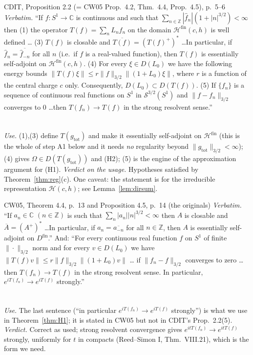 \documentclass[11pt]{article}
\newcommand{\Om}{\Omega}
\newcommand{\Hil}{\mathcal H}
\newcommand{\norm}[1]{\lVert #1\rVert}
\newcommand{\gtot}{g_{\mathrm{tot}}}
\newcommand{\Hfin}{\Hil^{\mathrm{fin}}}
\begin{document}
\begin{citedbox}{CDIT, Proposition 2.2 (= CW05 Prop.~4.2, Thm.~4.4, Prop.~4.5), p.~5--6}
\emph{Verbatim.} ``If $f:S^1\to\mathbb C$ is continuous and such that $\sum_{n\in\mathbb Z}|\hat f_n|(1+|n|^{3/2})<\infty$
then (1) the operator $T(f)=\sum_n L_n\hat f_n$ on the domain $\Hil^{\mathrm{fin}}(c,h)$ is well defined \dots
(3) $T(f)$ is closable and $\overline{T(f)}=(T(f)^+)^*$ \dots In particular, if $\hat f_n=\overline{\hat f_{-n}}$
for all $n$ (i.e.\ if $f$ is a real-valued function), then $T(f)$ is essentially self-adjoint on
$\Hil^{\mathrm{fin}}(c,h)$. (4) For every $\xi\in D(L_0)$ we have the following energy bounds
$\|T(f)\xi\|\le r\|f\|_{3/2}\|(1+L_0)\xi\|$, where $r$ is a function of the central charge $c$ only.
Consequently, $D(L_0)\subset D(T(f))$. (5) If $\{f_n\}$ is a sequence of continuous real functions on $S^1$ in
$\mathcal S^{3/2}(S^1)$ and $\|f-f_n\|_{3/2}$ converges to $0$ \dots then $T(f_n)\to T(f)$ in the strong resolvent sense.''
\\[2pt]
\\
\\[2pt]
\emph{Use.}  (1),(3) define $T(\gtot)$ and make it essentially self-adjoint on $\Hfin$ (this is the whole of step A1
below and it needs \emph{no} regularity beyond $\norm{\gtot}_{3/2}<\infty$); (4) gives $\Om\in D(T(\gtot))$ and (H2);
(5) is the engine of the approximation argument for (H1).
\emph{Verdict on the usage.}  Hypotheses satisfied by Theorem~\ref{thm:reg}(c).  One caveat: the statement is for the
irreducible representation $\Hil(c,h)$; see Lemma~\ref{lem:dirsum}.
\end{citedbox}

\begin{citedbox}{CW05, Theorem 4.4, p.~13 and Proposition 4.5, p.~14 (the originals)}
\emph{Verbatim.} ``If $a_n\in\mathbb C$ $(n\in\mathbb Z)$ is such that $\sum_{n}|a_n||n|^{3/2}<\infty$ then $A$ is
closable and $\overline A=(A^+)^*$ \dots In particular, if $a_n=\overline{a_{-n}}$ for all $n\in\mathbb Z$, then $A$
is essentially self-adjoint on $D^{\mathrm{fin}}$.''  And: ``For every continuous real function $f$ on $S^1$ of finite
$\|\cdot\|_{3/2}$ norm and for every $v\in D(L_0)$ we have $\|T(f)v\|\le r\|f\|_{3/2}\|(1+L_0)v\|$ \dots
if $\|f_n-f\|_{3/2}$ converges to zero \dots then $T(f_n)\to T(f)$ in the strong resolvent sense.  In particular,
$e^{iT(f_n)}\to e^{iT(f)}$ strongly.''\\[2pt]
\\
\\[2pt]
\emph{Use.}  The last sentence (``in particular $e^{iT(f_n)}\to e^{iT(f)}$ strongly'') is what we use in
Theorem~\ref{thm:H1}; it is stated in CW05 but not in CDIT's Prop.~2.2(5).  \emph{Verdict.} Correct as used;
strong resolvent convergence gives $e^{itT(f_n)}\to e^{itT(f)}$ strongly, uniformly for $t$ in compacts
(Reed--Simon I, Thm.~VIII.21), which is the form we need.
\end{citedbox}
\end{document}
